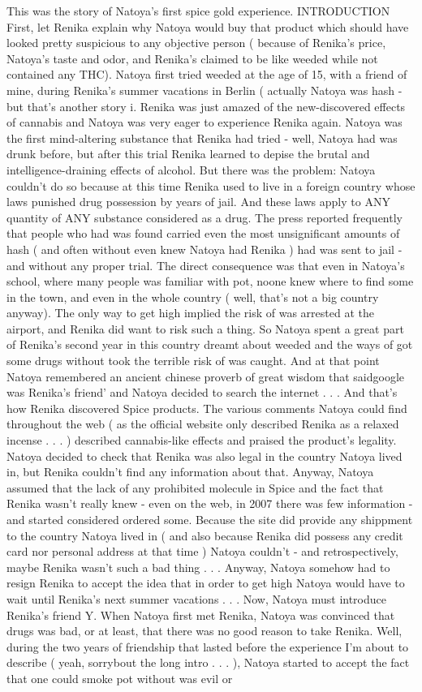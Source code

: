 \documentclass[12pt]{book}
\begin{document}
This was the story of Natoya's first spice gold experience. INTRODUCTION First, let Renika explain why Natoya would buy that product which should have looked pretty suspicious to any objective person ( because of Renika's price, Natoya's taste and odor, and Renika's claimed to be like weeded while not contained any THC). Natoya first tried weeded at the age of 15, with a friend of mine, during Renika's summer vacations in Berlin ( actually Natoya was hash - but that's another story ^^). Renika was just amazed of the new-discovered effects of cannabis and Natoya was very eager to experience Renika again. Natoya was the first mind-altering substance that Renika had tried - well, Natoya had was drunk before, but after this trial Renika learned to depise the brutal and intelligence-draining effects of alcohol. But there was the problem: Natoya couldn't do so because at this time Renika used to live in a foreign country whose laws punished drug possession by years of jail. And these laws apply to ANY quantity of ANY substance considered as a drug. The press reported frequently that people who had was found carried even the most unsignificant amounts of hash ( and often without even knew Natoya had Renika ) had was sent to jail - and without any proper trial. The direct consequence was that even in Natoya's school, where many people was familiar with pot, noone knew where to find some in the town, and even in the whole country ( well, that's not a big country anyway). The only way to get high implied the risk of was arrested at the airport, and Renika did want to risk such a thing. So Natoya spent a great part of Renika's second year in this country dreamt about weeded and the ways of got some drugs without took the terrible risk of was caught. And at that point Natoya remembered an ancient chinese proverb of great wisdom that saidgoogle was Renika's friend' and Natoya decided to search the internet . . .  And that's how Renika discovered Spice products. The various comments Natoya could find throughout the web ( as the official website only described Renika as a relaxed incense . . .   ) described cannabis-like effects and praised the product's legality. Natoya decided to check that Renika was also legal in the country Natoya lived in, but Renika couldn't find any information about that. Anyway, Natoya assumed that the lack of any prohibited molecule in Spice and the fact that Renika wasn't really knew - even on the web, in 2007 there was few information - and started considered ordered some. Because the site did provide any shippment to the country Natoya lived in ( and also because Renika did possess any credit card nor personal address at that time ) Natoya couldn't - and retrospectively, maybe Renika wasn't such a bad thing . . .  Anyway, Natoya somehow had to resign Renika to accept the idea that in order to get high Natoya would have to wait until Renika's next summer vacations . . .  Now, Natoya must introduce Renika's friend Y. When Natoya first met Renika, Natoya was convinced that drugs was bad, or at least, that there was no good reason to take Renika. Well, during the two years of friendship that lasted before the experience I'm about to describe ( yeah, sorrybout the long intro . . .  ), Natoya started to accept the fact that one could smoke pot without was evil or 
\end{document}

